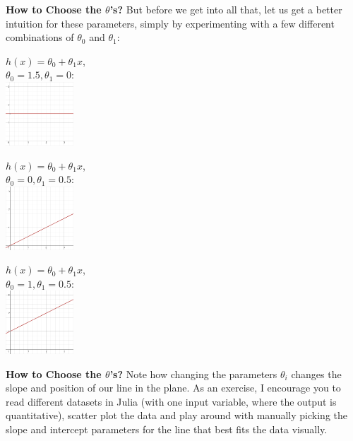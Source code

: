 \documentclass[xcolor=dvipsnames]{beamer}
\begin{document}
\begin{frame}
{\bf How to Choose the $\theta$'s?}
But before we get into all that, let us get a better intuition for these parameters, simply by experimenting with a few different combinations of $\theta_0$ and $\theta_1$:\vfill \pause
\begin{minipage}{1.2in}
{\small $h(x) = \theta_0 + \theta_1 x$, \\
$\theta_0 = 1.5, \theta_1 = 0$:\\}
\pause
\includegraphics[width=1in]{plot1.png}\\
\end{minipage}
\pause
\begin{minipage}{1.2in}
{\small $h(x) = \theta_0 + \theta_1 x$, \\
$\theta_0 = 0, \theta_1 = 0.5$:\\}
\pause
\includegraphics[width=1in]{plot2.png}\\
\end{minipage}
\pause
\begin{minipage}{1.2in}
{\small $h(x) = \theta_0 + \theta_1 x$, \\
$\theta_0 = 1, \theta_1 = 0.5$:\\}
\pause
\includegraphics[width=1in]{plot3.png}\\
\end{minipage}
\end{frame}

\begin{frame}
{\bf How to Choose the $\theta$'s?}
Note how changing the parameters $\theta_i$ changes the slope and position of our line in the plane. \vfill\pause As an exercise, I encourage you to read different datasets in Julia (with one input variable, where the output is quantitative), scatter plot the data and play around with manually picking the slope and intercept parameters for the line that best fits the data visually.\\
\end{frame}
\end{document}
